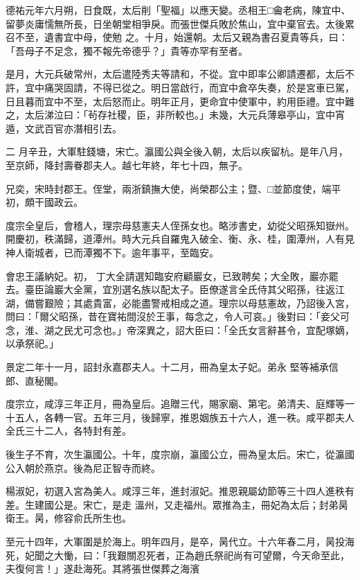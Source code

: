 \begin{pinyinscope}
 德祐元年六月朔，日食既，太后削「聖福」以應天變。丞相王□龠老病，陳宜中、留夢炎庸懦無所長，日坐朝堂相爭戾。而張世傑兵敗於焦山，宜中棄官去。太後累召不至，遺書宜中母，使勉
 之。十月，始還朝。太后又親為書召夏貴等兵，曰：「吾母子不足念，獨不報先帝德乎？」貴等亦罕有至者。



 是月，大元兵破常州，太后遣陸秀夫等請和，不從。宜中即率公卿請遷都，太后不許，宜中痛哭固請，不得已從之。明日當啟行，而宜中倉卒失奏，於是宮車已駕，日且暮而宜中不至，太后怒而止。明年正月，更命宜中使軍中，約用臣禮。宜中難之，太后涕泣曰：「茍存社稷，臣，非所較也。」未幾，大元兵薄皋亭山，宜中宵遁，文武百官亦潛相引去。



 二
 月辛丑，大軍駐錢塘，宋亡。瀛國公與全後入朝，太后以疾留杭。是年八月，至京師，降封壽眷郡夫人。越七年終，年七十四，無子。



 兄奕，宋時封郡王。侄堂，兩浙鎮撫大使，尚榮郡公主；暨、□並節度使，端平初，頗干國政云。



 度宗全皇后，會稽人，理宗母慈憲夫人侄孫女也。略涉書史，幼從父昭孫知嶽州。開慶初，秩滿歸，道潭州。時大元兵自羅鬼入破全、衡、永、桂，圍潭州，人有見神人衛城者，已而潭獨不下。逾年事平，至臨安。



 會忠王議納妃。初，
 丁大全請選知臨安府顧巖女，已致聘矣；大全敗，巖亦罷去。臺臣論巖大全黨，宜別選名族以配太子。臣僚遂言全氏侍其父昭孫，往返江湖，備嘗艱險；其處貴富，必能盡警戒相成之道。理宗以母慈憲故，乃詔後入宮，問曰：「爾父昭孫，昔在寶祐間沒於王事，每念之，令人可哀。」後對曰：「妾父可念，淮、湖之民尤可念也。」帝深異之，詔大臣曰：「全氏女言辭甚令，宜配塚嫡，以承祭祀。」



 景定二年十一月，詔封永嘉郡夫人。十二月，冊為皇太子妃。弟永
 堅等補承信郎、直秘閣。



 度宗立，咸淳三年正月，冊為皇后。追贈三代，賜家廟、第宅。弟清夫、庭輝等一十五人，各轉一官。五年三月，後歸寧，推恩姻族五十六人，進一秩。咸平郡夫人全氏三十二人，各特封有差。



 後生子不育，次生瀛國公。十年，度宗崩，瀛國公立，冊為皇太后。宋亡，從瀛國公入朝於燕京。後為尼正智寺而終。



 楊淑妃，初選入宮為美人。咸淳三年，進封淑妃。推恩親屬幼節等三十四人進秩有差。生建國公是。宋亡，是走
 溫州，又走福州。眾推為主，冊妃為太后；封弟昺衛王。昺，修容俞氏所生也。



 至元十四年，大軍圍是於海上。明年四月，是卒，昺代立。十六年春二月，昺投海死，妃聞之大慟，曰：「我艱關忍死者，正為趙氏祭祀尚有可望爾，今天命至此，夫復何言！」遂赴海死。其將張世傑葬之海濱



\end{pinyinscope}